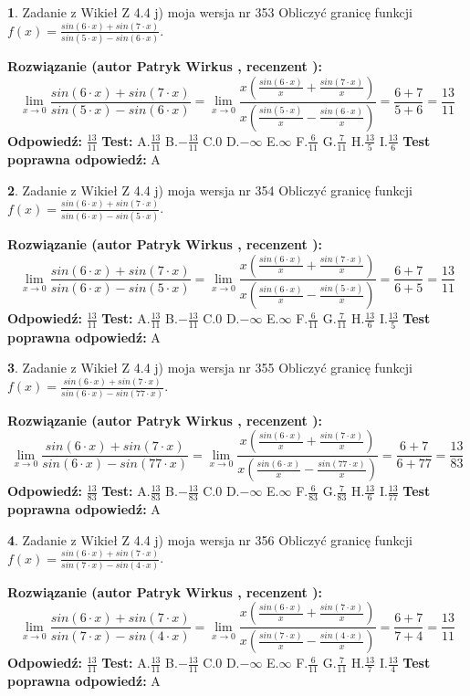 \documentclass[12pt, a4paper]{article}
\theoremstyle{definition} %
\newtheorem{zad}{}
\newcommand{\zadStart}[1]{\begin{zad}#1\newline}
\newcommand{\zadStop}{\end{zad}}
\newcommand{\rozwStart}[2]{\noindent \textbf{Rozwiązanie (autor #1 , recenzent #2): }\newline}
\newcommand{\rozwStop}{\newline}
\newcommand{\odpStart}{\noindent \textbf{Odpowiedź:}\newline}
\newcommand{\odpStop}{\newline}
\newcommand{\testStart}{\noindent \textbf{Test:}\newline}
\newcommand{\testStop}{\newline}
\newcommand{\kluczStart}{\noindent \textbf{Test poprawna odpowiedź:}\newline}
\newcommand{\kluczStop}{\newline}
\begin{document}
\zadStart{Zadanie z Wikieł Z 4.4 j) moja wersja nr 353}
Obliczyć granicę funkcji $f(x)=\frac{sin(6\cdot x) +sin(7\cdot x)}{sin(5\cdot x) -sin(6\cdot x)}$.
\zadStop
\rozwStart{Patryk Wirkus}{}
$$\lim\limits_{x\to 0}\frac{sin(6\cdot x) +sin(7\cdot x)}{sin(5\cdot x) -sin(6\cdot x)}=\lim\limits_{x\to 0}\frac{x(\frac{sin(6\cdot x)}{x}+\frac{sin(7\cdot x)}{x})}{x(\frac{sin(5\cdot x)}{x}-\frac{sin(6\cdot x)}{x})}=\frac{6+7}{5+6} = \frac{13}{11}$$
\rozwStop
\odpStart
$\frac{13}{11}$
\odpStop
\testStart
A.$\frac{13}{11}$
B.$-\frac{13}{11}$
C.$0$
D.$-\infty$
E.$\infty$
F.$\frac{6}{11}$
G.$\frac{7}{11}$
H.$\frac{13}{5}$
I.$\frac{13}{6}$
\testStop
\kluczStart
A
\kluczStop



\zadStart{Zadanie z Wikieł Z 4.4 j) moja wersja nr 354}
Obliczyć granicę funkcji $f(x)=\frac{sin(6\cdot x) +sin(7\cdot x)}{sin(6\cdot x) -sin(5\cdot x)}$.
\zadStop
\rozwStart{Patryk Wirkus}{}
$$\lim\limits_{x\to 0}\frac{sin(6\cdot x) +sin(7\cdot x)}{sin(6\cdot x) -sin(5\cdot x)}=\lim\limits_{x\to 0}\frac{x(\frac{sin(6\cdot x)}{x}+\frac{sin(7\cdot x)}{x})}{x(\frac{sin(6\cdot x)}{x}-\frac{sin(5\cdot x)}{x})}=\frac{6+7}{6+5} = \frac{13}{11}$$
\rozwStop
\odpStart
$\frac{13}{11}$
\odpStop
\testStart
A.$\frac{13}{11}$
B.$-\frac{13}{11}$
C.$0$
D.$-\infty$
E.$\infty$
F.$\frac{6}{11}$
G.$\frac{7}{11}$
H.$\frac{13}{6}$
I.$\frac{13}{5}$
\testStop
\kluczStart
A
\kluczStop



\zadStart{Zadanie z Wikieł Z 4.4 j) moja wersja nr 355}
Obliczyć granicę funkcji $f(x)=\frac{sin(6\cdot x) +sin(7\cdot x)}{sin(6\cdot x) -sin(77\cdot x)}$.
\zadStop
\rozwStart{Patryk Wirkus}{}
$$\lim\limits_{x\to 0}\frac{sin(6\cdot x) +sin(7\cdot x)}{sin(6\cdot x) -sin(77\cdot x)}=\lim\limits_{x\to 0}\frac{x(\frac{sin(6\cdot x)}{x}+\frac{sin(7\cdot x)}{x})}{x(\frac{sin(6\cdot x)}{x}-\frac{sin(77\cdot x)}{x})}=\frac{6+7}{6+77} = \frac{13}{83}$$
\rozwStop
\odpStart
$\frac{13}{83}$
\odpStop
\testStart
A.$\frac{13}{83}$
B.$-\frac{13}{83}$
C.$0$
D.$-\infty$
E.$\infty$
F.$\frac{6}{83}$
G.$\frac{7}{83}$
H.$\frac{13}{6}$
I.$\frac{13}{77}$
\testStop
\kluczStart
A
\kluczStop



\zadStart{Zadanie z Wikieł Z 4.4 j) moja wersja nr 356}
Obliczyć granicę funkcji $f(x)=\frac{sin(6\cdot x) +sin(7\cdot x)}{sin(7\cdot x) -sin(4\cdot x)}$.
\zadStop
\rozwStart{Patryk Wirkus}{}
$$\lim\limits_{x\to 0}\frac{sin(6\cdot x) +sin(7\cdot x)}{sin(7\cdot x) -sin(4\cdot x)}=\lim\limits_{x\to 0}\frac{x(\frac{sin(6\cdot x)}{x}+\frac{sin(7\cdot x)}{x})}{x(\frac{sin(7\cdot x)}{x}-\frac{sin(4\cdot x)}{x})}=\frac{6+7}{7+4} = \frac{13}{11}$$
\rozwStop
\odpStart
$\frac{13}{11}$
\odpStop
\testStart
A.$\frac{13}{11}$
B.$-\frac{13}{11}$
C.$0$
D.$-\infty$
E.$\infty$
F.$\frac{6}{11}$
G.$\frac{7}{11}$
H.$\frac{13}{7}$
I.$\frac{13}{4}$
\testStop
\kluczStart
A
\kluczStop
\end{document}
